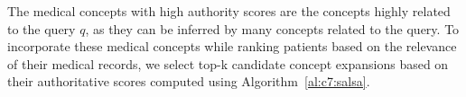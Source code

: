 \documentclass[1p]{elsarticle}
\begin{document}
The medical concepts with high authority scores are the concepts highly related to the query $q$, as they can be inferred by many concepts related to the query. 
To incorporate these medical concepts while ranking patients based on the relevance of their medical records, we select top-k candidate concept expansions based on their authoritative scores computed using Algorithm~\ref{al:c7:salsa}.
\end{document}
